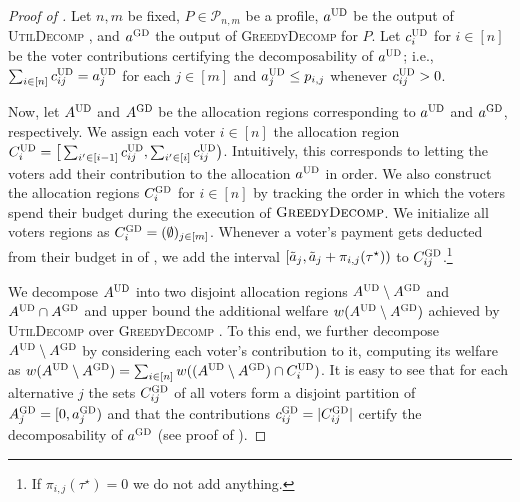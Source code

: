 \documentclass[11pt]{article}
\newcommand{\optd}{\textsc{UD}}
\newcommand{\GrdDec}{\textsc{GreedyDecomp} }
\newcommand{\GrdDecs}{\textsc{GD} }%
\newcommand{\UtDec}{\textsc{UtilDecomp} }
\begin{document}
\begin{proof}[Proof of ]
    Let $n,m$ be fixed, $P \in \mathcal{P}_{n,m}$ be a profile, $a^\optd$ be the output of \UtDec, and $a^\GrdDecs$ the output of \GrdDec for $P$. 
    Let $c^\optd_i$ for $i \in [n]$ be the voter contributions certifying the decomposability of $a^\optd$; i.e., $\sum_{i \in [n]} c^\optd_{ij} = a^\optd_j$ for each $j \in [m]$ and $a^\optd_j \le p_{i,j}$ whenever $c^\optd_{ij} > 0$. 

    Now, let $A^\optd$ and $A^\GrdDecs$ be the allocation regions corresponding to $a^\optd$ and  $a^\GrdDecs$, respectively.
    We %
    assign each voter $i\in [n]$ the allocation region $C^\optd_i = \big[\sum_{i' \in [i-1]} c^\optd_{ij}, \sum_{i' \in [i]} c^\optd_{ij}\big)$. Intuitively, this corresponds to letting the voters add their contribution to the allocation $a^\optd$ in order. We also construct the allocation regions $C^\GrdDecs_i$ for $i \in [n]$ by tracking the order in which the voters spend their budget during the execution of $\GrdDec$. We initialize all voters regions as $C^\GrdDecs_i = (\emptyset)_{j \in [m]}$. Whenever a voter's payment gets deducted from their budget in  of , we add the interval $[\Tilde{a}_j, \Tilde{a}_j+\pi_{i,j}(\tau^\star))$ to $C^\GrdDecs_{ij}$.\footnote{If $\pi_{i,j}(\tau^\star) = 0$ we do not add anything.}

    We decompose $A^\optd$ into two disjoint allocation regions $A^\optd \setminus A^\GrdDecs$ and $A^\optd \cap A^\GrdDecs$ and upper bound the additional welfare $w(A^\optd \setminus A^\GrdDecs)$ achieved by \UtDec over \GrdDec. To this end, we further decompose $A^\optd \setminus A^\GrdDecs$ by considering each voter's contribution to it, computing its welfare as $w(A^\optd \setminus A^\GrdDecs) = \sum_{i \in [n]} w((A^\optd \setminus A^\GrdDecs) \cap C^\optd_i)$. It is easy to see that for each alternative $j$ the sets $C^\GrdDecs_{ij}$ of all voters form a disjoint partition of $A^\GrdDecs_j = [0, a^\GrdDecs_j)$ and that the contributions $c^\GrdDecs_{ij} = |C^\GrdDecs_{ij}|$ certify the decomposability of $a^\GrdDecs$ (see proof of ).
    

\end{proof}
\end{document}
